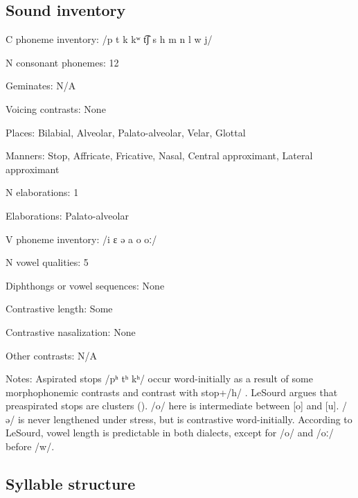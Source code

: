 {\subsection*{Sound inventory}
\begin{appendixdesc}

\item[C phoneme inventory:] /p t k kʷ t͡ʃ s h m n l w j/

\item[N consonant phonemes:] 12

\item[Geminates:] N/A

\item[Voicing contrasts:] None

\item[Places:] Bilabial, Alveolar, Palato-alveolar, Velar, Glottal

\item[Manners:] Stop, Affricate, Fricative, Nasal, Central approximant, Lateral approximant

\item[N elaborations:] 1

\item[Elaborations:] Palato-alveolar

\item[V phoneme inventory:] /i ɛ ə a o oː/

\item[N vowel qualities:] 5

\item[Diphthongs or vowel sequences:] None

\item[Contrastive length:] Some

\item[Contrastive nasalization:] None

\item[Other contrasts:] N/A

\item[Notes:] Aspirated stops /pʰ tʰ kʰ/ occur word-initially as a result of some morphophonemic contrasts and contrast with stop+/h/ \citep{Sherwood1986}. LeSourd argues that preaspirated stops are clusters (\citeyear[38--41]{Leavitt1996}). /o/ here is intermediate between [o] and [u]. /ə/ is never lengthened under stress, but is contrastive word-initially. According to LeSourd, vowel length is predictable in both dialects, except for /o/ and /oː/ before /w/.
\end{appendixdesc}
\subsection*{Syllable structure}
\begin{appendixdesc}


\end{appendixdesc}}
